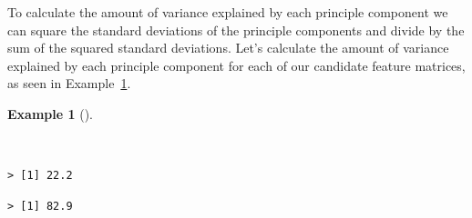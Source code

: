 \documentclass[
  letterpaper,
  DIV=11,
  numbers=noendperiod]{scrreport}
\newenvironment{Shaded}{\begin{snugshade}}{\end{snugshade}}
\newcommand{\CommentTok}[1]{\textcolor[rgb]{0.00,0.00,0.00}{\textit{#1}}}
\newcommand{\DecValTok}[1]{\textcolor[rgb]{0.00,0.00,0.00}{#1}}
\newcommand{\FunctionTok}[1]{\textcolor[rgb]{0.00,0.00,0.00}{#1}}
\newcommand{\NormalTok}[1]{\textcolor[rgb]{0.00,0.00,0.00}{#1}}
\newcommand{\OtherTok}[1]{\textcolor[rgb]{0.00,0.00,0.00}{#1}}
\newcommand{\SpecialCharTok}[1]{\textcolor[rgb]{0.00,0.00,0.00}{#1}}
\theoremstyle{definition}
\newtheorem{example}{Example}[chapter]
\theoremstyle{remark}
\begin{document}
To calculate the amount of variance explained by each principle
component we can square the standard deviations of the principle
components and divide by the sum of the squared standard deviations.
Let's calculate the amount of variance explained by each principle
component for each of our candidate feature matrices, as seen in
Example~\ref{exm-eda-masc-dtms-pca-variance}.

\begin{example}[]\protect\hypertarget{exm-eda-masc-dtms-pca-variance}{}\label{exm-eda-masc-dtms-pca-variance}

~

\begin{Shaded}
\end{Shaded}

\begin{verbatim}
> [1] 22.2
\end{verbatim}

\begin{Shaded}
\end{Shaded}

\begin{verbatim}
> [1] 82.9
\end{verbatim}


\end{example}
\end{document}
